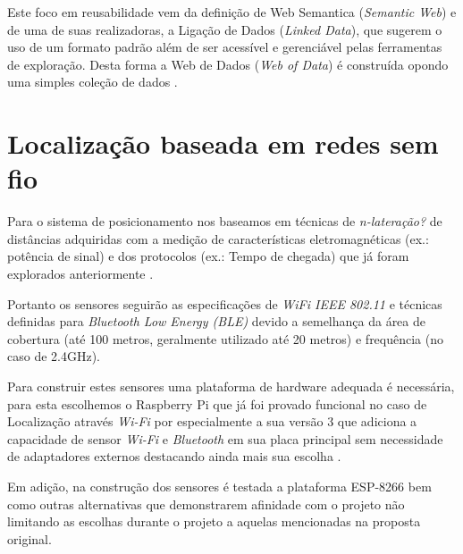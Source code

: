 Este foco em reusabilidade vem da definição de Web Semantica (\textit{Semantic
Web}) e de uma de suas realizadoras, a Ligação de Dados (\textit{Linked Data}),
que sugerem o uso de um formato padrão além de ser acessível e gerenciável pelas
ferramentas de exploração. Desta forma a Web de Dados (\textit{Web of Data}) é
construída opondo uma simples coleção de dados \cite{Bizer2009}.

\section{Localização baseada em redes sem fio}
\label{sec:Localização baseada em redes sem fio}

Para o sistema de posicionamento nos baseamos em técnicas de
\textit{n-lateração?} de distâncias adquiridas com a medição de características
eletromagnéticas (ex.: potência de sinal) e dos protocolos (ex.: Tempo de
chegada) que já foram explorados anteriormente \cite{Abusubaih2007,
bahillo2009ieee, Feldmann2003}.

Portanto os sensores seguirão as especificações de \textit{WiFi IEEE 802.11}
\cite{Crow1997} e técnicas definidas para \textit{Bluetooth Low Energy (BLE)}
\cite{Hossain2007} devido a semelhança da área de cobertura (até 100 metros,
geralmente utilizado até 20 metros) e frequência (no caso de 2.4GHz).

Para construir estes sensores uma plataforma de hardware adequada é necessária,
para esta escolhemos o Raspberry Pi \cite{Vujovic2014, Vujovic2015} que já
foi provado funcional no caso de Localização através \textit{Wi-Fi} por
 especialmente a sua versão 3 que adiciona a capacidade
de sensor \textit{Wi-Fi} e \textit{Bluetooth} em sua placa principal sem
necessidade de adaptadores externos destacando ainda mais sua escolha
\cite{RPI2016}.

Em adição, na construção dos sensores é testada a plataforma ESP-8266 bem como
outras alternativas que demonstrarem afinidade com o projeto não limitando as
escolhas durante o projeto a aquelas mencionadas na proposta original.
